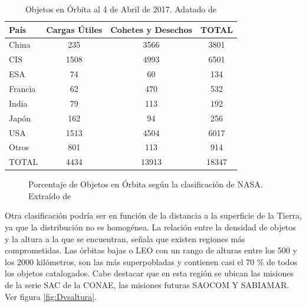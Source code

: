 \begin{table}
 \centering
 \begin{tabular}{|l|c|c|c|}
  \hline \hline
  \rowcolor{lightgray}
  \bf{Pa\'is}  &    \bf{Cargas \'Utiles} & \bf{Cohetes y Desechos} & TOTAL\\
  \hline \hline
  China & 235 & 3566&3801\\
  \hline
  CIS & 1508&4993&6501\\
  \hline
  ESA &74&60&134\\
  \hline
  Francia & 62&470&532\\
  \hline
  India & 79 & 113 & 192\\
  \hline
  Jap\'on & 162 & 94 & 256\\
  \hline
  USA & 1513 & 4504 & 6017\\
  \hline
  Otros & 801 & 113 & 914 \\
  \hline\hline
  \rowcolor{lightgray}
  TOTAL & 4434 & 13913 & 18347 \\
  \hline\hline
 \end{tabular}
 \caption[Objetos en \'Orbita al 4 de Abril de 2017.]{Objetos en \'Orbita al 4 de Abril de 2017. Adatado de \cite{ODQN}}
 \label{tab:objpais}
\end{table}

\begin{figure}[!h]
\centering
    \caption[Objetos en \'Orbita seg\'un NASA.]{Porcentaje de Objetos en \'Orbita seg\'un la clasificaci\'on de NASA. Extra\'ido de \cite{ODQN}}
    \label{fig:catxtipo}
\end{figure}

Otra clasificaci\'on podr\'ia ser en funci\'on de la distancia a la superficie de la Tierra, ya que la distribuci\'on no es homog\'enea. La relaci\'on entre la densidad de objetos y la altura a la que se encuentran, señala que existen regiones m\'as comprometidas.
Las \'orbitas bajas o \ac{LEO} con un rango de alturas entre los 500 y los 2000 kil\'ometros, son las m\'as superpobladas y contienen casi el 70 \% de todos los objetos catalogados. 
Cabe destacar que en esta regi\'on se ubican las misiones de la serie SAC de la CONAE, las misiones futuras SAOCOM Y SABIAMAR. Ver figura \ref{fig:Dvsaltura}.\\

